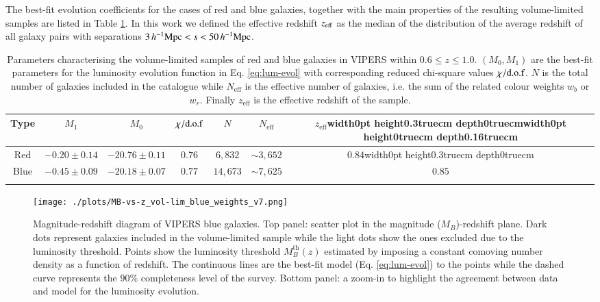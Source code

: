 \documentclass[longauth]{aa}
\def\({\left(}
\def\){\right)}
\def\mhmpc{\,h^{-1}{\rm Mpc}}
\def\bigstrutup{\vrule width0pt height0.3truecm depth0truecm}
\def\bigstrutdown{\vrule width0pt height0truecm depth0.16truecm}
\begin{document}
The best-fit evolution coefficients for the cases of red and blue galaxies, together with the main properties of the resulting volume-limited samples are listed in Table \ref{tab:lum-evol_data}. In this work we defined the effective redshift $z_{\rm{eff}}$ as the median of the distribution of the average redshift of all galaxy pairs with separations $3\mhmpc<s<50\mhmpc$.



\begin{table}
		\scriptsize
                \begin{center}
                        \begin{tabular}{	c						c					c				c					c						c							c}
                               \hline
                               \hline
						Type			&		$M_1$			&		$M_0$		&	$\rm{\chi/d.o.f}$		&	$N$		&	$N_{\mathrm{eff}}$	&		$z_{\mathrm{eff}}$\bigstrutup\bigstrutdown\\
                                \hline
						Red				&		$-0.20\pm0.14$		&	$-20.76\pm0.11$	&	$0.76$						&	$6,832$				&		$\sim3,652$		&		$0.84$\bigstrutup\\
						Blue			&		$-0.45\pm0.09$		&	$-20.18\pm0.07$	&	$0.77$						&	$14,673$			&		$\sim7,625$		&		$0.85$\\
                                \hline
                                \hline
                                \\
                        \end{tabular}
                \caption{Parameters characterising the volume-limited samples of red and blue galaxies in VIPERS within $0.6\le z\le1.0$. $\(M_0,M_1\)$ are the best-fit parameters for the luminosity evolution function in Eq. \eqref{eq:lum-evol} with corresponding reduced chi-square values $\rm{\chi/d.o.f}$. $N$ is the total number of galaxies included in the catalogue while $N_{\mathrm{eff}}$ is the effective number of galaxies, i.e. the sum of the related colour weights $w_b$ or $w_r$. Finally $z_{\mathrm{eff}}$ is the effective redshift of the sample.}\label{tab:lum-evol_data}
                \end{center}
        \end{table}
\begin{figure}
    	\centering
		\texttt{[image: ./plots/MB-vs-z\_vol-lim\_blue\_weights\_v7.png]}
		\caption{Magnitude-redshift diagram of VIPERS blue galaxies. Top panel: scatter plot in the magnitude ($M_B$)-redshift plane. Dark dots represent galaxies included in the volume-limited sample while the light dots show the ones excluded due to the luminosity threshold. Points show the luminosity threshold $M_B^{\mathrm{th}}(z)$ estimated by imposing a constant comoving number density as a function of redshift. The continuous lines are the best-fit model (Eq. \ref{eq:lum-evol}) to the points while the dashed curve represents the $90\%$ completeness level of the survey. Bottom panel: a zoom-in to highlight the agreement between data and model for the luminosity evolution.}\label{fig:vol-lim_blue_data}
	\end{figure}
\end{document}

